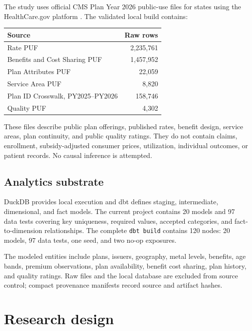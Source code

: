 \documentclass[11pt]{article}
\begin{document}
The study uses official CMS Plan Year 2026 public-use files for states using the
HealthCare.gov platform \cite{cmspuf,cmsfaq}. The validated local build contains:

\begin{table}[h]
\centering
\begin{tabular}{lr}
\toprule
Source & Raw rows \\
\midrule
Rate PUF & 2,235,761 \\
Benefits and Cost Sharing PUF & 1,457,952 \\
Plan Attributes PUF & 22,059 \\
Service Area PUF & 8,820 \\
Plan ID Crosswalk, PY2025--PY2026 & 158,746 \\
Quality PUF & 4,302 \\
\bottomrule
\end{tabular}
\end{table}

These files describe public plan offerings, published rates, benefit design,
service areas, plan continuity, and public quality ratings. They do not contain
claims, enrollment, subsidy-adjusted consumer prices, utilization, individual
outcomes, or patient records. No causal inference is attempted.

\subsection{Analytics substrate}

DuckDB provides local execution and dbt defines staging, intermediate,
dimensional, and fact models. The current project contains 20 models and 97 data
tests covering key uniqueness, required values, accepted categories, and
fact-to-dimension relationships. The complete \texttt{dbt build} contains 120
nodes: 20 models, 97 data tests, one seed, and two no-op exposures.

The modeled entities include plans, issuers, geography, metal levels, benefits,
age bands, premium observations, plan availability, benefit cost sharing, plan
history, and quality ratings. Raw files and the local database are excluded from
source control; compact provenance manifests record source and artifact hashes.

\section{Research design}
\end{document}
